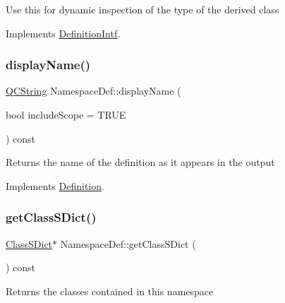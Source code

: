 Use this for dynamic inspection of the type of the derived class 

Implements \mbox{\hyperlink{class_definition_intf_ac8ee00bc1af5558ae37f6896d16f5a3a}{Definition\+Intf}}.

\mbox{\label{class_namespace_def_a7893c9a6525e3fc406ddfa9f9dd031f1}} 
\subsubsection{\texorpdfstring{displayName()}{displayName()}}
{\footnotesize\ttfamily \mbox{\hyperlink{class_q_c_string}{Q\+C\+String}} Namespace\+Def\+::display\+Name (\begin{DoxyParamCaption}\item[{bool}]{include\+Scope = {\ttfamily TRUE} }\end{DoxyParamCaption}) const\hspace{0.3cm}{\ttfamily [virtual]}}

Returns the name of the definition as it appears in the output 

Implements \mbox{\hyperlink{class_definition_ac4741f70f06baac174cf71b3e11d06ac}{Definition}}.

\mbox{\label{class_namespace_def_a7094dc9c0adb8fcfa6fbba05e1eeb045}} 
\subsubsection{\texorpdfstring{getClassSDict()}{getClassSDict()}}
{\footnotesize\ttfamily \mbox{\hyperlink{class_class_s_dict}{Class\+S\+Dict}}$\ast$ Namespace\+Def\+::get\+Class\+S\+Dict (\begin{DoxyParamCaption}{ }\end{DoxyParamCaption}) const\hspace{0.3cm}{\ttfamily [inline]}}

Returns the classes contained in this namespace \mbox{\label{class_namespace_def_a48e0e9f760ca4e65c884e957d45f0fed}} 
